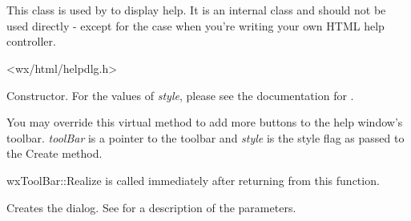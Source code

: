 %
%

\section{}\label{wxhtmlhelpdialog}

This class is used by  
to display help.
It is an internal class and should not be used directly - except for the case
when you're writing your own HTML help controller.




<wx/html/helpdlg.h>


\label{wxhtmlhelpdialogwxhtmlhelpdialog}



Constructor. For the values of {\it style}, please see the documentation for .

\label{wxhtmlhelpdialogaddtoolbarbuttons}


You may override this virtual method to add more buttons to the help window's
toolbar. {\it toolBar} is a pointer to the toolbar and {\it style} is the style
flag as passed to the Create method.

wxToolBar::Realize is called immediately after returning from this function.

\label{wxhtmlhelpdialogcreate}


Creates the dialog. See 
for a description of the parameters.

